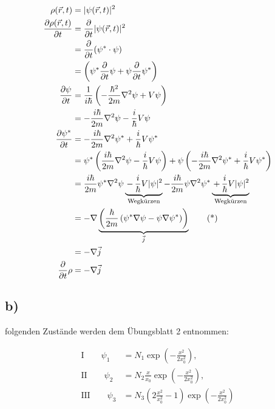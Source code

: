     \begin{align*}
        \rho(\vec{r},t) &= \lvert\psi(\vec{r},t)\rvert^2\\
        \frac{\partial\rho(\vec{r},t)}{\partial t} &= \frac{\partial}{\partial t} \lvert\psi(\vec{r},t)\rvert^2\\
        &= \frac{\partial}{\partial t} (\psi^* \cdot \psi)\\
        &= \left( \psi^* \frac{\partial}{\partial t} \psi + \psi \frac{\partial}{\partial t} \psi^* \right)\\
        \frac{\partial \psi}{\partial t} &= \frac{1}{i\hbar} \left( -\frac{\hbar^2}{2m} \nabla^2 \psi + V\psi \right)\\
        &= - \frac{i\hbar}{2m}\nabla^2 \psi - \frac{i}{\hbar} V \psi\\
        \frac{\partial \psi^*}{\partial t} &= -\frac{i\hbar}{2m} \nabla^2 \psi^* + \frac{i}{\hbar} V \psi^*\\
        &= \psi^* \left( \frac{i\hbar}{2m} \nabla^2 \psi - \frac{i}{\hbar} V \psi \right) + \psi \left( -\frac{i\hbar}{2m} \nabla^2 \psi^* + \frac{i}{\hbar} V \psi^* \right)\\
        &= \frac{i\hbar}{2m} \psi^* \nabla^2 \psi \underbrace{\,-\,\frac{i}{\hbar} V \lvert\psi\rvert^2}_{\text{Wegk\"urzen}} - \frac{i\hbar}{2m} \psi \nabla^2 \psi^* \underbrace{\,+\,\frac{i}{\hbar} V \lvert\psi\rvert^2}_{\text{Wegk\"urzen}}\\
        &= - \nabla \underbrace{\left( \frac{\hbar}{2m} \left( \psi^* \nabla \psi - \psi \nabla \psi^* \right) \right)}_{\vec{j}} \tag{*}\\
        &= - \nabla \vec{j}\\
        \frac{\partial}{\partial t}\rho &= -\nabla\vec{j} 
    \end{align*}

\newpage
\subsection{b)}

    \justifying folgenden Zustände werden dem Übungsblatt 2 entnommen:

    \noindent\makebox[\linewidth]{\rule{\textwidth}{1pt}}
    \begin{align*}
        \text{I} \qquad \psi_1 &= N_1 \exp \left(-\frac{x^2}{2x_0^2} \right),\\
        \text{II} \qquad \psi_2 &= N_2 \frac{x}{x_0} \exp \left( -\frac{x^2}{2x_0^2} \right),\\
        \text{III} \qquad \psi_3 &= N_3 \left( 2\frac{x^2}{x_0^2}-1 \right) \exp \left( -\frac{x^2}{2x_0^2} \right)
    \end{align*}
    \noindent\makebox[\linewidth]{\rule{\textwidth}{1pt}}


